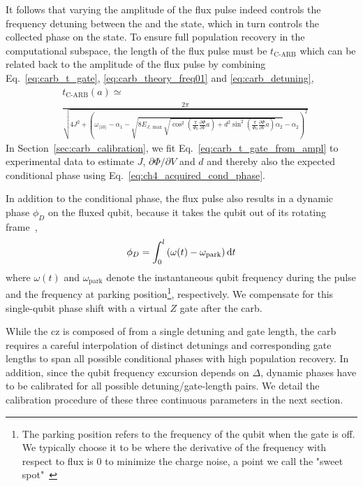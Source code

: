 It follows that varying the amplitude of the flux pulse indeed controls the frequency detuning between the \oo{} and the \tz{} state, which in turn controls the collected phase on the \oo{} state. To ensure full population recovery in the computational subspace, the length of the flux pulse must be $t_{\textrm{C-ARB}}$ which can be related back to the amplitude of the flux pulse by combining Eq.~\eqref{eq:carb_t_gate}, \eqref{eq:carb_theory_freq01} and \eqref{eq:carb_detuning},
\begin{equation} \label{eq:carb_t_gate_from_ampl}
\begin{split}
    &t_{\textrm{C-ARB}}(a)\simeq\\
    &   \frac{2\pi}{\sqrt{4J^2+\left(\omega _ { | 10 \rangle } - \alpha _ { 1 } - \sqrt{8  E _ { J , \max } \sqrt { \cos ^ { 2 } \left( \frac{\pi}{\Phi_0}\frac { \partial \Phi } {  \partial V } a \right) + d ^ { 2 } \sin ^ { 2 } \left( \frac{\pi}{\Phi_0}\frac { \partial \Phi} { \partial V } a \right)} \alpha_2} - \alpha_2 \right)^2}}
\end{split}
\end{equation}
In Section~\ref{sec:carb_calibration}, we fit Eq.~\eqref{eq:carb_t_gate_from_ampl} to experimental data to estimate $J$, $ \partial \Phi/ \partial V $ and $d$ and thereby also the expected conditional phase using Eq.~\eqref{eq:ch4_acquired_cond_phase}.

In addition to the conditional phase, the flux pulse also results in a dynamic phase $\phi_D$ on the fluxed qubit,  because it takes the qubit out of its rotating frame~\cite{DiCarlo2009DemonstrationProcessor},
\begin{equation} \label{eq:carb_dyn_phase}
    \phi_D = \int_0^l{(\omega(t)-\omega_{\textrm{park}})\,\mathrm d t}
\end{equation}
where $\omega(t)$ and $\omega_{\textrm{park}}$ denote the instantaneous qubit frequency during the pulse and the frequency at parking position\footnote{The parking position refers to the frequency of the qubit when the gate is off. We typically choose it to be where the derivative of the frequency with respect to flux is 0 to minimize the charge noise, a point we call the "sweet spot"~\cite{Vion2003QuantumProcessing}}, respectively. We compensate for this single-qubit phase shift with a virtual $Z$ gate after the \gls{carb}.

While the \gls{cz} is composed of from a single detuning and gate length, the \gls{carb} requires a careful interpolation of distinct detunings and corresponding gate lengths to span all possible conditional phases with high \oo{} population recovery. In addition, since the qubit frequency excursion depends on $\Delta$, dynamic phases have to be calibrated for all possible detuning/gate-length pairs. We detail the calibration procedure of these three continuous parameters in the next section.

